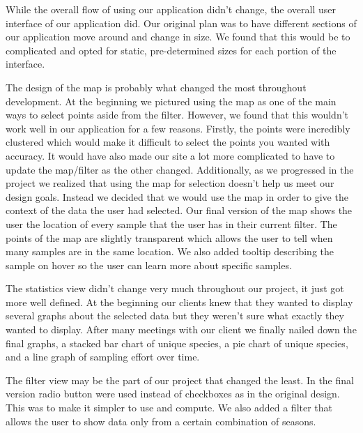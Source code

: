 While the overall flow of using our application didn't change, the overall user interface of our application did.
Our original plan was to have different sections of our application move around and change in size.
We found that this would be to complicated and opted for static, pre-determined sizes for each portion of the interface.

The design of the map is probably what changed the most throughout development.
At the beginning we pictured using the map as one of the main ways to select points aside from the filter.
However, we found that this wouldn't work well in our application for a few reasons.
Firstly, the points were incredibly clustered which would make it difficult to select the points you wanted with accuracy.
It would have also made our site a lot more complicated to have to update the map/filter as the other changed.
Additionally, as we progressed in the project we realized that using the map for selection doesn't help us meet our design goals.
Instead we decided that we would use the map in order to give the context of the data the user had selected.
Our final version of the map shows the user the location of every sample that the user has in their current filter.
The points of the map are slightly transparent which allows the user to tell when many samples are in the same location.
We also added tooltip describing the sample on hover so the user can learn more about specific samples.

The statistics view didn't change very much throughout our project, it just got more well defined.
At the beginning our clients knew that they wanted to display several graphs about the selected data but they weren't sure what exactly they wanted to display.
After many meetings with our client we finally nailed down the final graphs, a stacked bar chart of unique species, a pie chart of unique species, and a line graph of sampling effort over time.

The filter view may be the part of our project that changed the least.
In the final version radio button were used instead of checkboxes as in the original design.
This was to make it simpler to use and compute.
We also added a filter that allows the user to show data only from a certain combination of seasons.

